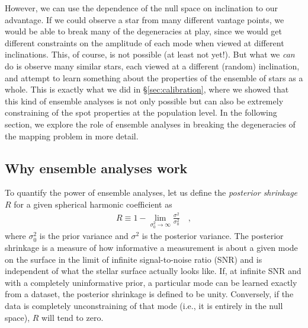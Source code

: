 \documentclass[modern]{aastex62}
\begin{document}
However, we can use the dependence of the null space on inclination to our
advantage. If we could observe a star from many different vantage points,
we would be able to break many of the degeneracies at play, since we
would get different constraints on the amplitude of each mode when viewed
at different inclinations. This, of course, is not possible (at least not
yet!). But what we \emph{can} do is observe many similar stars, each viewed
at a different (random) inclination, and attempt to learn something about
the properties of the ensemble of stars as a whole. This is exactly
what we did in \S\ref{sec:calibration}, where we showed that this kind
of ensemble analyses is not only possible but can also be extremely
constraining of the spot properties at the population level. In the
following section, we explore the role of ensemble analyses in breaking
the degeneracies of the mapping problem in more detail.

\subsection{Why ensemble analyses work}
\label{sec:ensemble}

To quantify the power of ensemble analyses,
let us define the \emph{posterior shrinkage} $R$ for a given
spherical harmonic coefficient as
%
\begin{align}
    \label{eq:shrinkage}
    R \equiv 1 - \lim\limits_{\sigma_0^2 \rightarrow \infty}
    \frac{\sigma^2}{\sigma_0^2}
    \quad,
\end{align}
%
where $\sigma_0^2$ is the prior variance
and $\sigma^2$ is the posterior variance.
The posterior shrinkage is a measure of how informative a measurement is about a
given mode on the surface in the limit of infinite signal-to-noise ratio (SNR)
and is independent of what the stellar surface actually looks like.
If, at infinite SNR and with a completely uninformative prior,
a particular mode can be learned exactly from a dataset, the posterior
shrinkage is defined to be unity. Conversely, if the data is completely
unconstraining of that mode (i.e., it is entirely in the null space),
$R$ will tend to zero.
\end{document}
